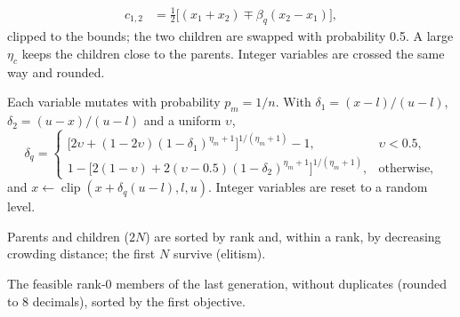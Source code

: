 \begin{description}[style=nextline]
\begin{align}
        c_{1,2}&=\tfrac12\bigl[(x_1+x_2)\mp\beta_q(x_2-x_1)\bigr],\nonumber
        \end{align}
        clipped to the bounds; the two children are swapped with probability 0.5. A large $\eta_c$ keeps the children
        close to the parents. Integer variables are crossed the same way and rounded.
  \item[Mutation (polynomial)] Each variable mutates with probability $p_m=1/n$. With
        $\delta_1=(x-l)/(u-l)$, $\delta_2=(u-x)/(u-l)$ and a uniform $\upsilon$,
        \begin{equation}
        \delta_q=\begin{cases}
        \bigl[2\upsilon+(1-2\upsilon)(1-\delta_1)^{\eta_m+1}\bigr]^{1/(\eta_m+1)}-1, & \upsilon<0.5,\\
        1-\bigl[2(1-\upsilon)+2(\upsilon-0.5)(1-\delta_2)^{\eta_m+1}\bigr]^{1/(\eta_m+1)}, & \text{otherwise,}
        \end{cases}
        \label{eq:ch08-pm}
        \end{equation}
        and $x\leftarrow\operatorname{clip}(x+\delta_q(u-l),l,u)$. Integer variables are reset to a random level.
  \item[Survival] Parents and children ($2N$) are sorted by rank and, within a rank, by decreasing crowding
        distance; the first $N$ survive (elitism).
  \item[Result] The feasible rank-0 members of the last generation, without duplicates (rounded to 8 decimals),
        sorted by the first objective.
\end{description}

